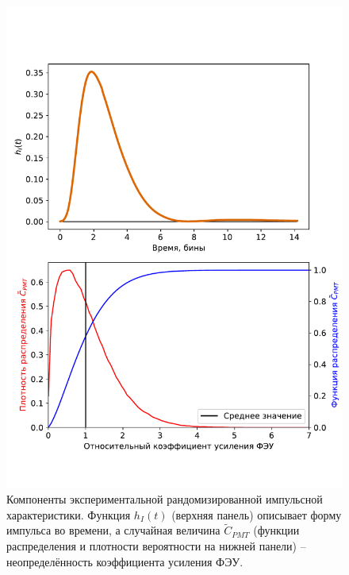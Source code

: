 \documentclass[12pt]{book}
\begin{document}
	\begin{figure}
		\centering
		\includegraphics[width=\columnwidth]{experimental-ir-params}
		\caption{Компоненты экспериментальной рандомизированной импульсной характеристики. Функция $h_I(t)$ (верхняя панель) описывает форму импульса во времени, а случайная величина $\tilde{C}_{PMT}$ (функции распределения и плотности вероятности на нижней панели) -- неопределённость коэффициента усиления ФЭУ.}
		\label{pic:experimental-rir-params}
	\end{figure}
\end{document}
